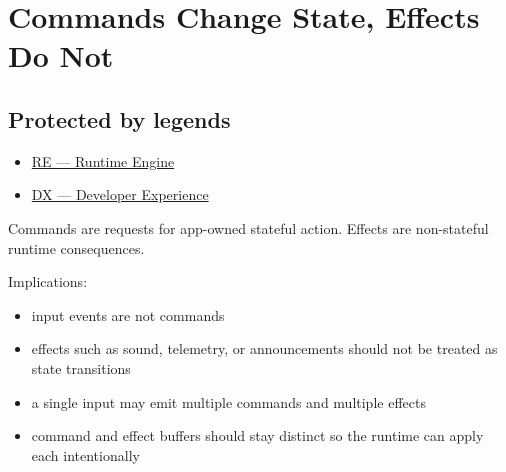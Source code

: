 \chapter{Commands Change State, Effects Do Not}\label{record-038}

\smallskip

\section{Protected by legends}\label{record-038-protected-by-legends}

\begin{itemize}
\tightlist
\item
  \href{https://github.com/flyingrobots/bijou/blob/1853ad902f6bf219326409e7f743a5a1d6517dbc/docs/legends/RE-runtime-engine.md}{RE --- Runtime Engine}
\item
  \href{https://github.com/flyingrobots/bijou/blob/1853ad902f6bf219326409e7f743a5a1d6517dbc/docs/legends/DX-developer-experience.md}{DX --- Developer Experience}
\end{itemize}

Commands are requests for app-owned stateful action. Effects are non-stateful runtime consequences.

Implications:

\begin{itemize}
\tightlist
\item
  input events are not commands
\item
  effects such as sound, telemetry, or announcements should not be treated as state transitions
\item
  a single input may emit multiple commands and multiple effects
\item
  command and effect buffers should stay distinct so the runtime can apply each intentionally
\end{itemize}

